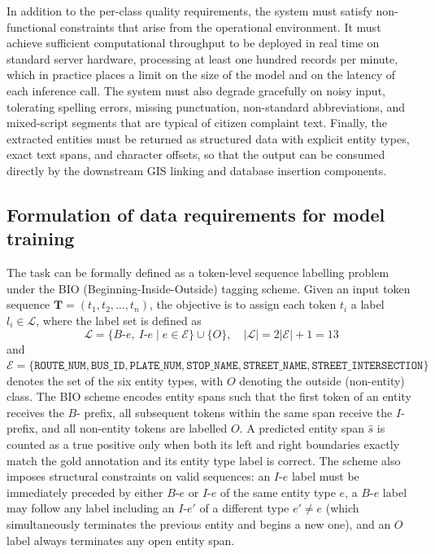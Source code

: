 In addition to the per-class quality requirements, the system must satisfy non-functional constraints that arise from the operational environment. It must achieve sufficient computational throughput to be deployed in real time on standard server hardware, processing at least one hundred records per minute, which in practice places a limit on the size of the model and on the latency of each inference call. The system must also degrade gracefully on noisy input, tolerating spelling errors, missing punctuation, non-standard abbreviations, and mixed-script segments that are typical of citizen complaint text. Finally, the extracted entities must be returned as structured data with explicit entity types, exact text spans, and character offsets, so that the output can be consumed directly by the downstream GIS linking and database insertion components.

\subsection{Formulation of data requirements for model training}
\label{sec:data_requirements}

The task can be formally defined as a token-level sequence labelling problem under the BIO (Beginning-Inside-Outside) tagging scheme. Given an input token sequence $\mathbf{T} = (t_1, t_2, \ldots, t_n)$, the objective is to assign each token $t_i$ a label $l_i \in \mathcal{L}$, where the label set is defined as
\begin{equation}
  \mathcal{L} = \{B\text{-}e,\ I\text{-}e \mid e \in \mathcal{E}\} \cup \{O\}, \quad |\mathcal{L}| = 2|\mathcal{E}| + 1 = 13
  \label{eq:labelset}
\end{equation}
and $\mathcal{E} = \{\texttt{ROUTE\_NUM}, \texttt{BUS\_ID}, \texttt{PLATE\_NUM}, \texttt{STOP\_NAME}, \texttt{STREET\_NAME}, \texttt{STREET\_INTERSECTION}\}$ denotes the set of the six entity types, with $O$ denoting the outside (non-entity) class. The BIO scheme encodes entity spans such that the first token of an entity receives the $B$- prefix, all subsequent tokens within the same span receive the $I$- prefix, and all non-entity tokens are labelled $O$. A predicted entity span $\hat{s}$ is counted as a true positive only when both its left and right boundaries exactly match the gold annotation and its entity type label is correct. The scheme also imposes structural constraints on valid sequences: an $I\text{-}e$ label must be immediately preceded by either $B\text{-}e$ or $I\text{-}e$ of the same entity type $e$, a $B\text{-}e$ label may follow any label including an $I\text{-}e'$ of a different type $e' \neq e$ (which simultaneously terminates the previous entity and begins a new one), and an $O$ label always terminates any open entity span.


